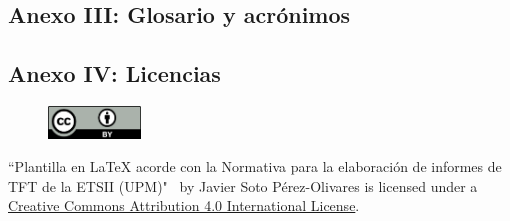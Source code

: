 \documentclass[a4paper, 12pt, spanish, twoside]{article}
\begin{document}
\clearpage




\newpage
\subsection{Anexo III: Glosario y acrónimos} \label{sec:anexo3}

\glsaddall


\printglossary[title=Glosario, toctitle=Glosario]

\printglossary[type=\acronymtype, title=Acrónimos, toctitle=Acrónimos]


\clearpage




\newpage
\subsection{Anexo IV: Licencias} \label{sec:anexo4}

\begin{figure}
    \vspace{-\baselineskip}
    \href{http://creativecommons.org/licenses/by/4.0/}{\includegraphics[width=0.22\textwidth]{cc-by.png}}
\end{figure} 

\vspace*{\fill}
``Plantilla en LaTeX acorde con la Normativa para la elaboración de informes de TFT de la ETSII (UPM)" \ by Javier Soto Pérez-Olivares is licensed under a \href{http://creativecommons.org/licenses/by/4.0/}{Creative Commons Attribution 4.0 International License}.

\clearpage



\end{document}
